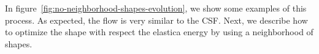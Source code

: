 \documentclass[smallextended]{svjour3}
\begin{document}
In figure~\ref{fig:no-neighborhood-shapes-evolution}, we show some examples of this process. As expected, the flow is very similar to the CSF. Next, we describe how to optimize the shape with respect the elastica energy by using a neighborhood of shapes.
%
%
%
\begin{figure}
	\center
	\hspace{2em}%
	\hspace{2em}%

\end{figure}
\end{document}
